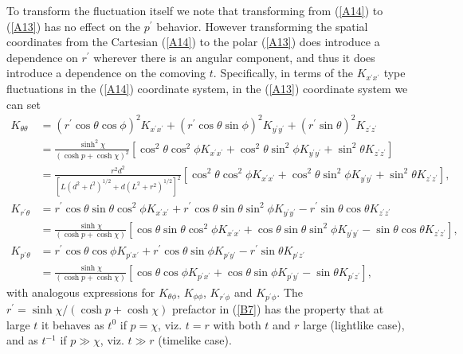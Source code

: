 \documentclass[aps]{revtex4}
\begin{document}
To transform the fluctuation itself we note that transforming from (\ref{A14}) to (\ref{A13}) has no effect on the $p^{\prime}$ behavior. However transforming  the spatial coordinates from the Cartesian (\ref{A14}) to the polar (\ref{A13}) does introduce a dependence on $r^{\prime}$ wherever there is an angular component, and thus it does introduce a dependence on the comoving $t$. Specifically, in terms of the $K_{x^{\prime}x^{\prime}}$ type fluctuations in the (\ref{A14}) coordinate system, in the (\ref{A13}) coordinate system we can set 
%
\begin{align}
K_{\theta\theta}&=(r^{\prime}\cos\theta\cos\phi)^2K_{x^{\prime}x^{\prime}}+(r^{\prime}\cos\theta\sin\phi)^2K_{y^{\prime}y^{\prime}}+(r^{\prime}\sin\theta)^2K_{z^{\prime}z^{\prime}}
\nonumber\\
&=\frac{\sinh^2\chi}{(\cosh p+\cosh \chi)^2}[\cos^2\theta\cos^2\phi K_{x^{\prime}x^{\prime}}+\cos^2\theta\sin^2\phi K_{y^{\prime}y^{\prime}}+\sin^2\theta K_{z^{\prime}z^{\prime}}]
\nonumber\\
&=\frac{r^2d^2}{[L(d^2+t^2)^{1/2}+d(L^2+r^2)^{1/2}]^2}[\cos^2\theta\cos^2\phi K_{x^{\prime}x^{\prime}}+\cos^2\theta\sin^2\phi K_{y^{\prime}y^{\prime}}+\sin^2\theta K_{z^{\prime}z^{\prime}}],
\nonumber\\
K_{r^{\prime}\theta}&=r^{\prime}\cos\theta\sin\theta\cos^2\phi K_{x^{\prime}x^{\prime}}+r^{\prime}\cos\theta\sin\theta\sin^2\phi K_{y^{\prime}y^{\prime}}-r^{\prime}\sin\theta\cos\theta K_{z^{\prime}z^{\prime}}
\nonumber\\
&=\frac{\sinh\chi}{(\cosh p+\cosh \chi)}[\cos\theta\sin\theta\cos^2\phi K_{x^{\prime}x^{\prime}}+\cos\theta\sin\theta\sin^2\phi K_{y^{\prime}y^{\prime}}-\sin\theta\cos\theta K_{z^{\prime}z^{\prime}}],
\nonumber\\
K_{p^{\prime}\theta}&=r^{\prime}\cos\theta\cos\phi K_{p^{\prime}x^{\prime}}+r^{\prime}\cos\theta\sin\phi K_{p^{\prime}y^{\prime}}-r^{\prime}\sin\theta K_{p^{\prime}z^{\prime}}
\nonumber\\
&=\frac{\sinh\chi}{(\cosh p+\cosh \chi)}[\cos\theta\cos\phi K_{p^{\prime}x^{\prime}}+\cos\theta\sin\phi K_{p^{\prime}y^{\prime}}-\sin\theta K_{p^{\prime}z^{\prime}}],
\label{B7}
\end{align}
%
with analogous expressions for $K_{\theta\phi}$, $K_{\phi\phi}$, $K_{r^{\prime}\phi}$ and $K_{p^{\prime}\phi}$. The $r^{\prime}=\sinh \chi/(\cosh p +\cosh \chi)$ prefactor in (\ref{B7}) has the property that at large $t$ it behaves  as $t^0$ if $p=\chi$, viz. $t=r$ with both $t$ and $r$ large (lightlike case), and as $t^{-1}$ if $p\gg \chi$, viz. $t \gg r$ (timelike case).
\end{document}
